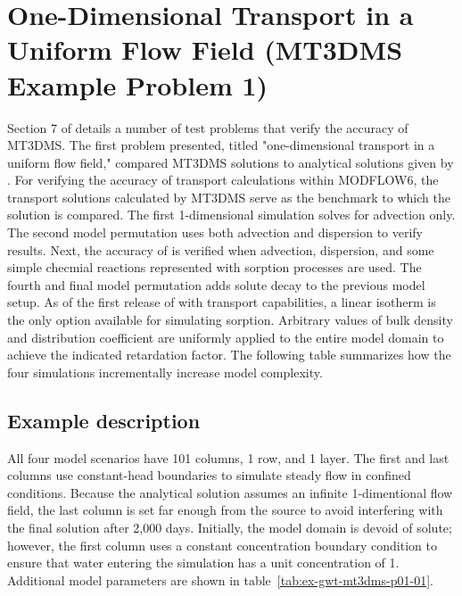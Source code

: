 \section{One-Dimensional Transport in a Uniform Flow Field (MT3DMS Example Problem 1)}

Section 7 of \cite{zheng1999mt3dms} details a number of test problems that verify the accuracy of MT3DMS.  The first problem presented, titled "one-dimensional transport in a uniform flow field," compared MT3DMS solutions to analytical solutions given by \cite{vanGenuchtenAlves1982}.  For verifying the accuracy of transport calculations within MODFLOW6, the transport solutions calculated by MT3DMS serve as the benchmark to which the \mf solution is compared.  The first 1-dimensional simulation solves for advection only.  The second model permutation uses both advection and dispersion to verify \mf results.  Next, the accuracy of \mf is verified when advection, dispersion, and some simple checmial reactions represented with sorption processes are used.  The fourth and final model permutation adds solute decay to the previous model setup. As of the first release of \mf with transport capabilities, a linear isotherm is the only option available for simulating sorption. Arbitrary values of bulk density and distribution coefficient are uniformly applied to the entire model domain to achieve the indicated retardation factor. The following table summarizes how the four simulations incrementally increase model complexity.



\subsection{Example description}

All four model scenarios have 101 columns, 1 row, and 1 layer. The first and last columns use constant-head boundaries to simulate steady flow in confined conditions. Because the analytical solution assumes an infinite 1-dimentional flow field, the last column is set far enough from the source to avoid interfering with the final solution after 2,000 days. Initially, the model domain is devoid of solute; however, the first column uses a constant concentration boundary condition to ensure that water entering the simulation has a unit concentration of 1. Additional model parameters are shown in table~\ref{tab:ex-gwt-mt3dms-p01-01}.

